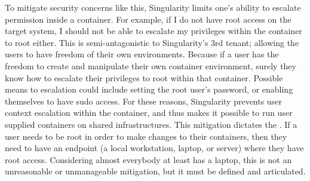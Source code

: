 \documentclass[letterpaper,10pt,english]{sphinxmanual}
\begin{document}
To mitigate security concerns like this, Singularity limits one’s
ability to escalate permission inside a container. For example, if I
do not have root access on the target system, I should not be able to
escalate my privileges within the container to root either. This is
semi-antagonistic to Singularity’s 3rd tenant; allowing the users to
have freedom of their own environments. Because if a user has the
freedom to create and manipulate their own container environment,
surely they know how to escalate their privileges to root within that
container. Possible means to escalation could include setting the root user’s password,
or enabling themselves to have sudo access. For these reasons,
Singularity prevents user context escalation within the container, and
thus makes it possible to run user supplied containers on shared
infrastructures.
This mitigation dictates the {\hyperref[\detokenize{singularity_flow:singularity-flow}]{}}. If a user needs to be root
in order to make changes to their containers, then they need to have
an endpoint (a local workstation, laptop, or server) where they have
root access. Considering almost everybody at least has a laptop, this
is not an unreasonable or unmanageable mitigation, but it must be
defined and articulated.
\end{document}
